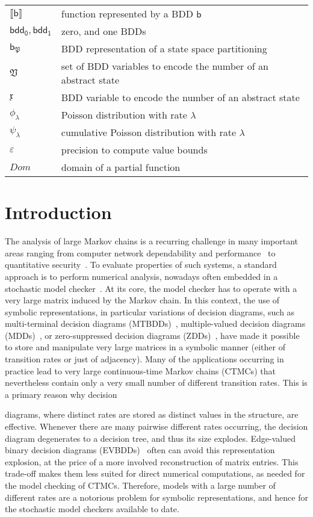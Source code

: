 \documentclass[10pt,twocolumn]{article}
\newcommand{\precision}{\varepsilon}
\newcommand{\apart}{\mathfrak{P}}
\newcommand{\avar}{\mathfrak{x}}
\newcommand{\avars}{\mathfrak{V}}
\newcommand{\bdd}{\mathsf{b}}
\newcommand{\bddZero}{\mathsf{bdd}_{\mathsf{0}}}
\newcommand{\bddOne}{\mathsf{bdd}_{\mathsf{1}}}
\newcommand{\dom}{\mathit{Dom}}
\newcommand{\sem}[1]{\ensuremath{\llbracket #1 \rrbracket}\xspace}
\begin{document}
\begin{supertabular}{p{1.6cm}p{5.7cm}}
  $\sem{\bdd}$ & function represented by a BDD $\bdd$\\
  $\bddZero, \bddOne$ & zero, and one BDDs\\
  $\bdd_\apart$ & BDD representation of a state space partitioning\\
  $\avars$ & set of BDD variables to encode the number of an abstract state\\
  $\avar$ & BDD variable to encode the number of an abstract state\\
  $\phi_\lambda$ & Poisson distribution with rate $\lambda$\\
  $\psi_\lambda$ & cumulative Poisson distribution with rate $\lambda$\\
  $\precision$ & precision to compute value bounds\\
  $\dom$ & domain of a partial function\\
\end{supertabular}

\section{Introduction}
\label{sec:introduction}
The analysis of large Markov chains is a
recurring challenge in many important areas ranging from computer
network dependability and performance~\cite{sand87a,haverkort-book} to
quantitative security~\cite{KopfB11}. To evaluate properties of such
systems, a standard approach is to perform numerical analysis,
nowadays often embedded in a stochastic model
checker~\cite{KNP11,KatoenZHHJ11,CiardoMW09,DeavoursCCDDDSW02}. At its
core, the model checker has to operate with a very large matrix
induced by the Markov chain. In this context, the use of symbolic
representations, in particular variations of decision diagrams, such
as multi-terminal decision
diagrams (MTBDDs)~\cite{Parker02,HermannsKNPS03}, multiple-valued decision diagrams (MDDs)~\cite{WanCM11}, or
zero-suppressed decision diagrams (ZDDs)~\cite{LampkaSOB10}, have made it possible to store and manipulate
very large matrices in a symbolic manner (either of
transition rates or just of adjacency). Many of the applications
occurring in practice lead to very large continuous-time Markov chains
(CTMCs) that nevertheless contain only a very small number of
different transition rates. This is a primary reason why decision

diagrams, where distinct rates are stored as distinct values in the
structure, are effective. Whenever there are many pairwise different
rates occurring, the decision diagram degenerates to a decision tree,
and thus its size explodes. Edge-valued binary decision
diagrams (EVBDDs)~\cite{LaiPV96} often can avoid this representation
explosion, at the price of a more involved reconstruction of matrix
entries. This trade-off makes them less suited for direct numerical
computations, as needed for the model checking of CTMCs. Therefore,
models with a large number of different rates are a
notorious problem for symbolic representations, and hence for the
stochastic model checkers available to date.
\end{document}

